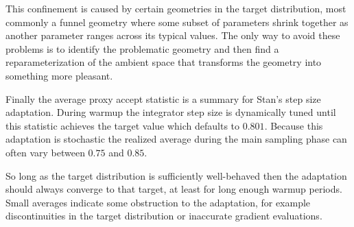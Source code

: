 \documentclass[
  letterpaper,
  DIV=11,
  numbers=noendperiod]{scrartcl}
\begin{document}
This confinement is caused by certain geometries in the target
distribution, most commonly a funnel geometry where some subset of
parameters shrink together as another parameter ranges across its
typical values. The only way to avoid these problems is to identify the
problematic geometry and then find a reparameterization of the ambient
space that transforms the geometry into something more pleasant.

Finally the average proxy accept statistic is a summary for Stan's step
size adaptation. During warmup the integrator step size is dynamically
tuned until this statistic achieves the target value which defaults to
\(0.801\). Because this adaptation is stochastic the realized average
during the main sampling phase can often vary between \(0.75\) and
\(0.85\).

So long as the target distribution is sufficiently well-behaved then the
adaptation should always converge to that target, at least for long
enough warmup periods. Small averages indicate some obstruction to the
adaptation, for example discontinuities in the target distribution or
inaccurate gradient evaluations.
\end{document}
